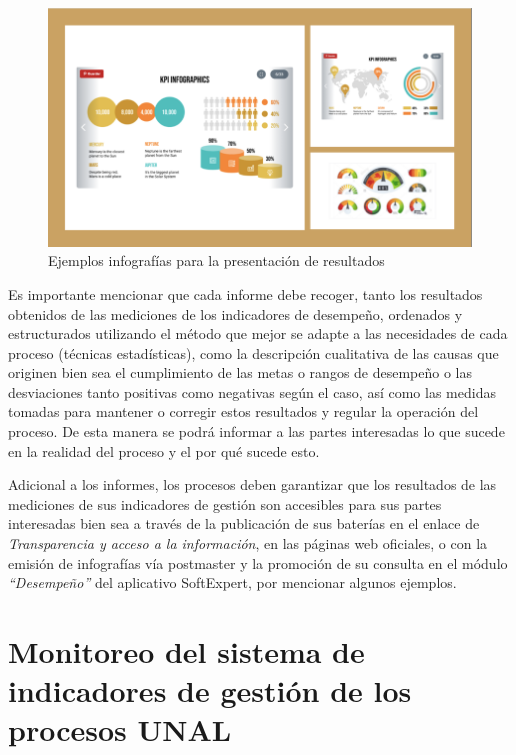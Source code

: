 \documentclass[
]{book}
\begin{document}
\begin{figure}

{\centering \includegraphics[width=0.8\linewidth]{Imagenes/figura_20} 

}

\caption{Ejemplos infografías para la presentación de resultados}\label{fig:figura20}
\end{figure}

Es importante mencionar que cada informe debe recoger, tanto los resultados obtenidos de las mediciones de los indicadores de desempeño, ordenados y estructurados utilizando el método que mejor se adapte a las necesidades de cada proceso (técnicas estadísticas), como la descripción cualitativa de las causas que originen bien sea el cumplimiento de las metas o rangos de desempeño o las desviaciones tanto positivas como negativas según el caso, así como las medidas tomadas para mantener o corregir estos resultados y regular la operación del proceso. De esta manera se podrá informar a las partes interesadas lo que sucede en la realidad del proceso y el por qué sucede esto.

Adicional a los informes, los procesos deben garantizar que los resultados de las mediciones de sus indicadores de gestión son accesibles para sus partes interesadas bien sea a través de la publicación de sus baterías en el enlace de \emph{Transparencia y acceso a la información}, en las páginas web oficiales, o con la emisión de infografías vía postmaster y la promoción de su consulta en el módulo \emph{``Desempeño''} del aplicativo SoftExpert, por mencionar algunos ejemplos.

\hypertarget{monitoreo-del-sistema-de-indicadores-de-gestiuxf3n-de-los-procesos-unal}{%
\section{Monitoreo del sistema de indicadores de gestión de los procesos UNAL}\label{monitoreo-del-sistema-de-indicadores-de-gestiuxf3n-de-los-procesos-unal}}
\end{document}
